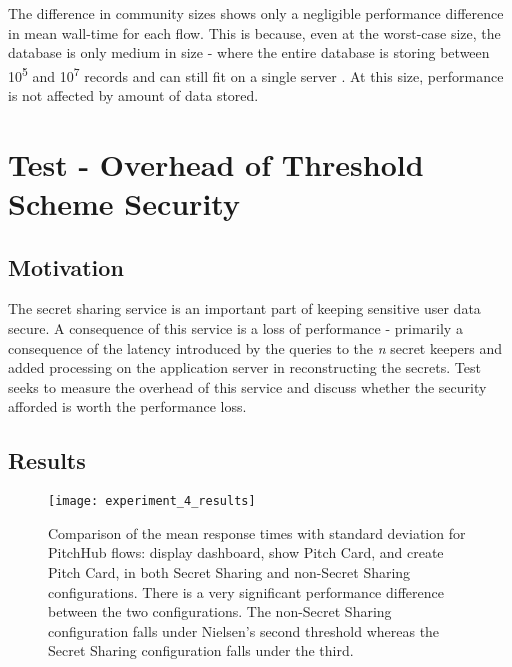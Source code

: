 The difference in community sizes shows only a negligible performance difference in mean wall-time for each flow. This is because, even at the worst-case size, the database is only medium in size - where the entire database is storing between 10\textsuperscript{5} and 10\textsuperscript{7} records and can still fit on a single server \cite{Large8:online}. At this size, performance is not affected by amount of data stored.

\section{Test  - Overhead of Threshold Scheme Security}

\subsection{Motivation}
The secret sharing service is an important part of keeping sensitive user data secure. A consequence of this service is a loss of performance - primarily a consequence of the latency introduced by the queries to the \textit{n} secret keepers and added processing on the application server in reconstructing the secrets. Test  seeks to measure the overhead of this service and discuss whether the security afforded is worth the performance loss.

\subsection{Results}

\begin{figure}[ht]
    \centering
    \texttt{[image: experiment\_4\_results]}
    \caption{Comparison of the mean response times with standard deviation for PitchHub flows: display dashboard, show Pitch Card, and create Pitch Card, in both Secret Sharing and non-Secret Sharing configurations. There is a very significant performance difference between the two configurations. The non-Secret Sharing configuration falls under Nielsen's second threshold whereas the Secret Sharing configuration falls under the third. }
    \label{fig:test_4_results}
\end{figure}

